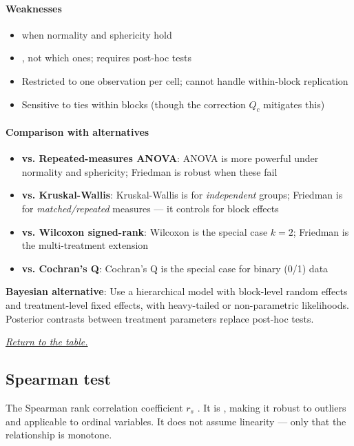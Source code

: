 \paragraph{Weaknesses}
\begin{itemize}
    \item {} when normality and sphericity hold
    \item {}, not which ones; requires post-hoc tests
    \item Restricted to one observation per cell; cannot handle within-block replication
    \item Sensitive to ties within blocks (though the correction $Q_c$ mitigates this)
\end{itemize}

\paragraph{Comparison with alternatives}
\begin{itemize}
    \item \textbf{vs. Repeated-measures ANOVA}: ANOVA is more powerful under normality
        and sphericity; Friedman is robust when these fail
    \item \textbf{vs. Kruskal-Wallis}: Kruskal-Wallis is for \emph{independent} groups;
        Friedman is for \emph{matched/repeated} measures — it controls for block effects
    \item \textbf{vs. Wilcoxon signed-rank}: Wilcoxon is the special case $k = 2$;
        Friedman is the multi-treatment extension
    \item \textbf{vs. Cochran's Q}: Cochran's Q is the special case for binary (0/1) data
\end{itemize}

\textbf{Bayesian alternative}: Use a hierarchical model with block-level random effects
and treatment-level fixed effects, with heavy-tailed or non-parametric likelihoods.
Posterior contrasts between treatment parameters replace post-hoc tests.

\textit{\hyperref[statistical_method_table]{Return to the table.}}

\subsection{Spearman test}

The Spearman rank correlation coefficient $r_s$ . It is , making it robust to outliers and applicable to ordinal
variables. It does not assume linearity — only that the relationship is monotone.

